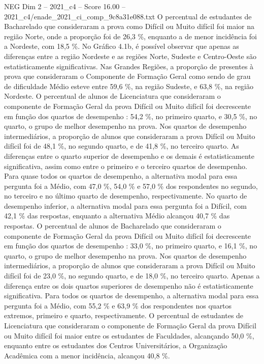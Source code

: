 \begin{textsample}{NEG Dim 2 – 2021\_c4 – Score 16.00 – 2021\_c4/enade\_2021\_ci\_comp\_9c8a31e088.txt}
O percentual de estudantes de Bacharelado que consideraram a prova como Difícil ou Muito difícil foi maior na região Norte, onde a proporção foi de 26,3 \%, enquanto a de menor incidência foi a Nordeste, com 18,5 \%.
No Gráfico 4.1b, é possível observar que apenas as diferenças entre a região Nordeste e as regiões Norte, Sudeste e Centro-Oeste são estatisticamente significativas.
Nas Grandes Regiões, a proporção de presentes à prova que consideraram o Componente de Formação Geral como sendo de grau de dificuldade Médio esteve entre 59,6 \%, na região Sudeste, e 63,8 \%, na região Nordeste.
O percentual de alunos de Licenciatura que consideraram o componente de Formação Geral da prova Difícil ou Muito difícil foi decrescente em função dos quartos de desempenho : 54,2 \%, no primeiro quarto, e 30,5 \%, no quarto, o grupo de melhor desempenho na prova.
Nos quartos de desempenho intermediários, a proporção de alunos que consideraram a prova Difícil ou Muito difícil foi de 48,1 \%, no segundo quarto, e de 41,8 \%, no terceiro quarto.
As diferenças entre o quarto superior de desempenho e os demais é estatisticamente significativa, assim como entre o primeiro e o terceiro quartos de desempenho.
Para quase todos os quartos de desempenho, a alternativa modal para essa pergunta foi a Médio, com 47,0 \%, 54,0 \% e 57,0 \% dos respondentes no segundo, no terceiro e no último quarto de desempenho, respectivamente.
No quarto de desempenho inferior, a alternativa modal para essa pergunta foi a Difícil, com 42,1 \% das respostas, enquanto a alternativa Médio alcançou 40,7 \% das respostas.
O percentual de alunos de Bacharelado que consideraram o componente de Formação Geral da prova Difícil ou Muito difícil foi decrescente em função dos quartos de desempenho : 33,0 \%, no primeiro quarto, e 16,1 \%, no quarto, o grupo de melhor desempenho na prova.
Nos quartos de desempenho intermediários, a proporção de alunos que consideraram a prova Difícil ou Muito difícil foi de 23,0 \%, no segundo quarto, e de 18,0 \%, no terceiro quarto.
Apenas a diferença entre os dois quartos superiores de desempenho não é estatisticamente significativa.
Para todos os quartos de desempenho, a alternativa modal para essa pergunta foi a Médio, com 55,2 \% e 63,9 \% dos respondentes nos quartos extremos, primeiro e quarto, respectivamente.
O percentual de estudantes de Licenciatura que consideraram o componente de Formação Geral da prova Difícil ou Muito difícil foi maior entre os estudantes de Faculdades, alcançando 50,0 \%, enquanto entre os estudantes dos Centros Universitários, a Organização Acadêmica com a menor incidência, alcançou 40,8 \%.

\end{textsample}
